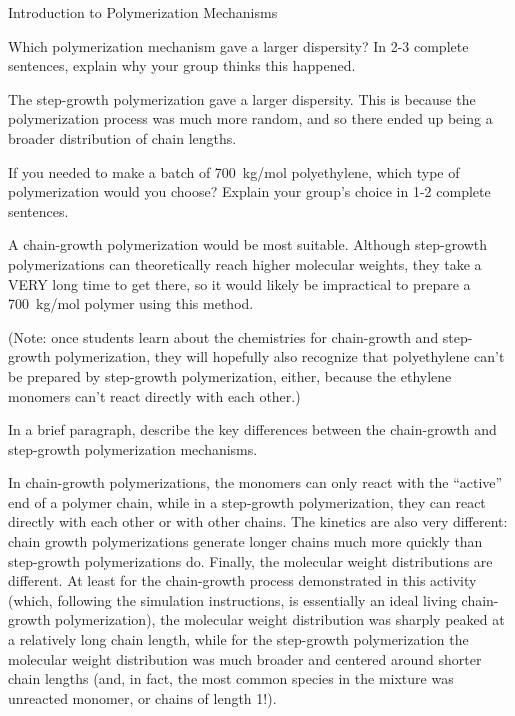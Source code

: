 \begin{activity}{Introduction to Polymerization Mechanisms}
\begin{ctqs}
	\question Which polymerization mechanism gave a larger dispersity?  In 2-3 complete sentences, explain why your group thinks this happened.
	
		\begin{solution}[1.75in]{}
			The step-growth polymerization gave a larger dispersity.  This is because the polymerization process was much more random, and so there ended up being a broader distribution of chain lengths.
		\end{solution}
	
	\question If you needed to make a batch of 700~kg/mol polyethylene, which type of polymerization would you choose?  Explain your group's choice in 1-2 complete sentences.
	
		\begin{solution}[1.75in]{}
			A chain-growth polymerization would be most suitable.  Although step-growth polymerizations can theoretically reach higher molecular weights, they take a VERY long time to get there, so it would likely be impractical to prepare a 700~kg/mol polymer using this method.
			
			(Note: once students learn about the chemistries for chain-growth and step-growth polymerization, they will hopefully also recognize that polyethylene can't be prepared by step-growth polymerization, either, because the ethylene monomers can't react directly with each other.)
		\end{solution}
	
\end{ctqs}

\clearpage
\begin{exercises}

		\exercise In a brief paragraph, describe the key differences between the chain-growth and step-growth polymerization mechanisms.
		
		\begin{solution}{}
			In chain-growth polymerizations, the monomers can only react with the ``active'' end of a polymer chain, while in a step-growth polymerization, they can react directly with each other or with other chains.  The kinetics are also very different: chain growth polymerizations generate longer chains much more quickly than step-growth polymerizations do.  Finally, the molecular weight distributions are different. At least for the chain-growth process demonstrated in this activity (which, following the simulation instructions, is essentially an ideal living chain-growth polymerization), the molecular weight distribution was sharply peaked at a relatively long chain length, while for the step-growth polymerization the molecular weight distribution was much broader and centered around shorter chain lengths (and, in fact, the most common species in the mixture was unreacted monomer, or chains of length 1!).
		\end{solution}
		

\end{exercises}
\end{activity}
